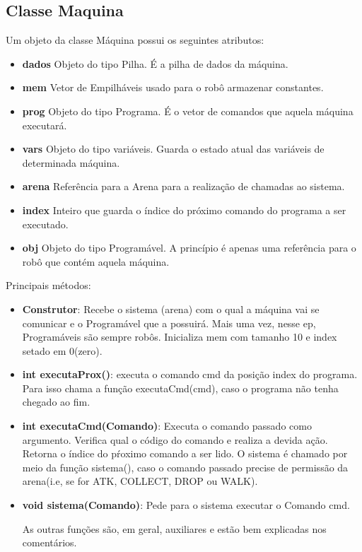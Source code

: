 \documentclass[11pt]{article}
\begin{document}
\subsection{Classe Maquina}

Um objeto da classe Máquina possui os seguintes atributos:
\begin{itemize}

\item \textbf{dados}
	Objeto do tipo Pilha. É a pilha de dados da máquina.
\item \textbf{mem}
	Vetor de Empilháveis usado para o robô armazenar constantes.
\item \textbf{prog}
	Objeto do tipo Programa. É o vetor de comandos que aquela máquina executará.
\item \textbf{vars}
	Objeto do tipo variáveis. Guarda o estado atual das variáveis de determinada máquina.
\item \textbf{arena}
	Referência para a Arena para a realização de chamadas ao sistema.
\item \textbf{index}
	Inteiro que guarda o índice do próximo comando do programa a ser executado.
\item \textbf{obj}
	Objeto do tipo Programável. A princípio é apenas uma referência para o robô que contém aquela máquina.
\end{itemize}


Principais métodos:

\begin{itemize}

	\item \textbf{Construtor}: Recebe o sistema (arena) com o qual a máquina vai se comunicar e o Programável que a possuirá.
				Mais uma vez, nesse ep, Programáveis são sempre robôs. Inicializa mem com tamanho 10 e index setado em 0(zero).
		

	\item \textbf{{\color{red}int} executaProx()}: executa o comando cmd da posição index do programa. Para isso chama a função executaCmd(cmd), caso o programa não tenha chegado ao fim.
		
	\item \textbf{{\color{red}int} executaCmd({\color{red}Comando})}: Executa o comando passado como argumento. Verifica  qual o código do comando e realiza a devida ação.
									 Retorna o índice do pŕoximo comando a ser lido. O sistema é chamado por meio da função sistema(), caso o comando passado precise de permissão da arena(i.e, se for ATK, COLLECT, DROP ou WALK).

	\item \textbf{{\color{red}void} sistema({\color{red}Comando})}:	 Pede para o sistema executar o Comando cmd.

		As outras funções são, em geral, auxiliares e estão bem explicadas nos comentários.

\end{itemize}
\end{document}
